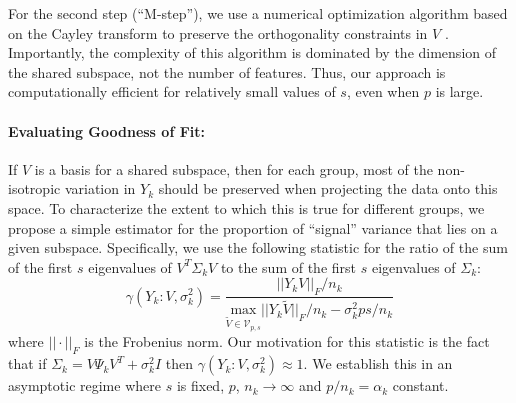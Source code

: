 \documentclass[12pt]{article}
\begin{document}
For the second step (``M-step''), we use a numerical optimization algorithm based on
the Cayley transform to preserve the orthogonality constraints in $V$
\citep{Wen2013}.  Importantly, the complexity of this algorithm is
dominated by the dimension of the shared subspace, not the number of
features.  Thus, our approach is computationally efficient for
relatively small values of $s$, even when $p$ is large.

\paragraph{Evaluating Goodness of Fit:}

If $V$ is a basis for a shared subspace, then for each group, most
of the non-isotropic variation in $Y_k$ should be preserved when
projecting the data onto this space.  To characterize the extent to
which this is true for different groups, we propose a simple estimator
for the proportion of ``signal'' variance that lies on a given
subspace.  Specifically, we use the following statistic for the ratio
of the sum of the first $s$ eigenvalues of
$V^T \Sigma_k V$ to the sum of the first $s$ eigenvalues
of $\Sigma_k$:
%
\begin{equation}
\gamma(Y_k: V, \sigma_k^2) = \frac{||Y_kV||_F/n_k}{\underset{\widetilde{V} \in \mathcal{V}_{p, s}}{\text{max}}
  ||Y_k\widetilde{V}||_F/n_k - \sigma_k^2ps/n_k}
\label{eqn:ratio}
\end{equation}
%
\noindent where $||\cdot||_F$ is the Frobenius norm. Our motivation for
this statistic is the fact that if
$\Sigma_k = V\Psi_kV^T + \sigma_k^2I$ then
$\gamma(Y_k: V, \sigma_k^2) \approx 1$.  We establish
this in an asymptotic regime where $s$ is fixed, $p$,
$n_k \rightarrow \infty$ and $p/n_k = \alpha_k$ constant.
\end{document}
